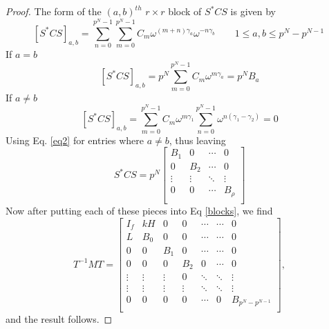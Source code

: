 \documentclass[preprint,12pt]{elsarticle}
\theoremstyle{definition}
\theoremstyle{remark}
\begin{document}
\begin{proof}
The form of the $ (a,b)^{th} $ $r\times r$ block of $ S^*CS$ is given by $$ \left[S^*CS \right]_{a,b}=  {\sum\limits_{n = 0}^{{p^N} - 1} {\sum\limits_{m = 0}^{{p^N} - 1} {{C_m}{\omega ^{(m + n){\gamma _a}}}{\omega ^{ - n{\gamma _b}}}} } } \qquad 1\leq a, b \leq p^N-p^{N-1}\  $$
If $a=b$ $$  \left[S^*CS \right]_{a,b}={{p^N}\sum\limits_{m = 0}^{{p^N} - 1} {{C_m}{\omega ^{m{\gamma _a}}}} }=p^NB_a$$
If $a\neq b$ $$  \left[S^*CS \right]_{a,b}= {\sum\limits_{m = 0}^{{p^N} - 1} {{C_m}{\omega ^{m{\gamma _1}}}\sum\limits_{n = 0}^{{p^N} - 1} {{\omega ^{n({\gamma _1} - {\gamma _2})}}} } }=0$$
Using Eq. \ref{eq2} for entries where $a\neq b$, thus leaving
$${S^*}CS =
 p^N \left[ {\begin{matrix}
  B_1 & {0} &  \cdots  & {0}  \\
   {0} & B_2  &  \cdots  & {0}  \\
    \vdots  &  \vdots  &  \ddots  &  \vdots   \\
   {0} & {0} &  \cdots  & B_{\rho}   \\
 \end{matrix} } \right]
 $$
Now after putting each of these pieces into Eq \ref{blocks}, we find
\[
T^{-1}MT = \left[\begin{array}{rrrrrrr}
I_f & kH & 0 & 0 & \cdots & \cdots & 0 \\
L & B_0 & 0 & 0 & \cdots & \cdots & 0 \\
0 & 0 & B_1 & 0 & \cdots & \cdots & 0 \\
0 & 0 & 0 & B_2  & 0  & \cdots & 0 \\
\vdots & \vdots & \vdots & 0 & \ddots & \ddots & \vdots \\
\vdots & \vdots & \vdots & \vdots & \ddots & \ddots & \vdots \\
0 & 0 & 0 &0  & \cdots  & 0 &B_{p^N-p^{N-1}} \\
\end{array}\right],
\]
and the result follows.


\end{proof}
\end{document}
